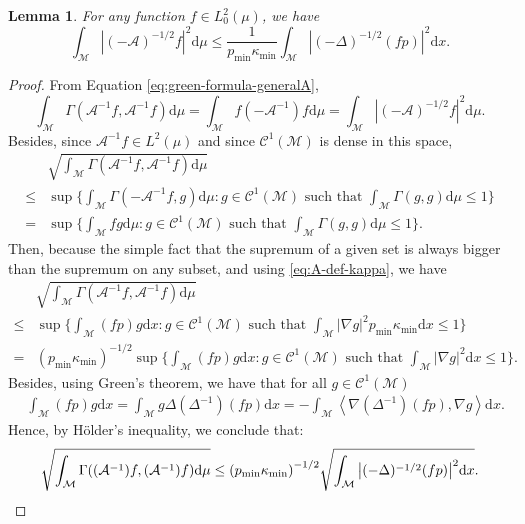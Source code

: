 \documentclass[10pt,a4paper]{article}
\newcommand\cA{\mathcal{A}}
\newcommand\cC{\mathcal{C}}
\newcommand\cM{\mathcal{M}}
\newcommand\dd{\mathrm{d}}
\newcommand{\ABS}[1]{{{\left| #1 \right|}}} %
\newcommand{\SCA}[1]{{{\left\langle #1\right\rangle}}} %
\newcommand{\PAR}[1]{{{\left(#1\right)}}} %
\newtheorem{lemma}[theorem]{Lemma}
\begin{document}
\begin{lemma}\label{lemma: var-lem 3}
	For any function $f \in L^2_0(\mu)$, we have
	$$\int_{\cM} \ABS{(-\mathcal{A})^{-1/2}f}  ^2 \dd \mu \le  \frac{1}{p_{\min}\kappa_{\min}} \int_{\cM} \ABS{(-\Delta)^{-1/2}(fp)}  ^2 \dd x.$$
\end{lemma}
\begin{proof}
From Equation \eqref{eq:green-formula-generalA}, $$ \int_{\cM} \Gamma( \mathcal{A}^{-1} f,\mathcal{A}^{-1} f ) \dd \mu  =\int_{\cM}f\PAR{-\cA^{-1}}f\dd \mu= \int_{\cM} \ABS{(-\mathcal{A})^{-1/2}f}  ^2 \dd \mu. $$
Besides, since $\mathcal{A}^{-1} f \in L^2(\mu)$ and since $\cC^1(\cM)$ is dense in this space,
\begin{align*}
	&\sqrt{ \int_{\cM} \Gamma( \mathcal{A}^{-1} f,\mathcal{A}^{-1} f ) \dd \mu } \\
	\le& \sup \Big\{  \int_{\cM} \Gamma(-\mathcal{A}^{-1} f, g ) \mathrm{d}\mu  : g \in \cC^1(\cM) \text{ such that } \int_{\mathcal{M}} \Gamma(g,g) \mathrm{d} \mu \le 1 \Big\}\\
	=&  \sup \Big\{  \int_{\cM} f g \dd \mu : g \in \mathcal{C}^1(\cM) \text{ such that } \int_{\mathcal{M}} \Gamma(g,g) \mathrm{d} \mu \le 1 \Big\}.
\end{align*}
Then, because the simple fact that the supremum of a given set is always bigger than the supremum on any subset, and using \eqref{eq:A-def-kappa}, we have
\begin{align*}
	&\sqrt{ \int_{\cM} \Gamma( \mathcal{A}^{-1} f,\mathcal{A}^{-1} f ) \dd \mu }\\
	\le & \sup \Big\{  \int_{\cM} (fp) g \dd x : g \in \mathcal{C}^1(\cM) \text{ such that } \int_\cM \ABS{\nabla g}^2 p_{\min}\kappa_{\min} \dd x\le 1 \Big\}\\
	=  & \PAR{p_{\min}\kappa_{\min}}^{-1/2} \sup \Big\{  \int_{\cM} (fp) g \dd x : g \in \mathcal{C}^1(\cM) \text{ such that } \int_\cM \ABS{\nabla g}^2  \dd x\le 1 \Big\}. 
\end{align*}
Besides, using Green's theorem, we have  that for all $g \in \cC^1(\cM)$
\begin{align*}
	&  \int_{\cM} (fp) g \dd x = \int_{\cM} g \Delta (\Delta^{-1})(fp)  \dd x =  -\int_\cM \SCA{ \nabla (\Delta^{-1}) (fp) , \nabla g} \dd x.	
\end{align*}
Hence, by Hölder's inequality, we conclude that:
$$ \sqrt{ \int_{\cM} \Gamma( (\mathcal{A}^{-1}) f,(\mathcal{A}^{-1}) f) \dd \mu } \le   \PAR{p_{\min}\kappa_{\min}}^{-1/2} \sqrt{\int_{\cM} \ABS{(-\Delta)^{-1/2}(fp)}  ^2 \dd x }. \qedhere$$
\end{proof}
\end{document}
